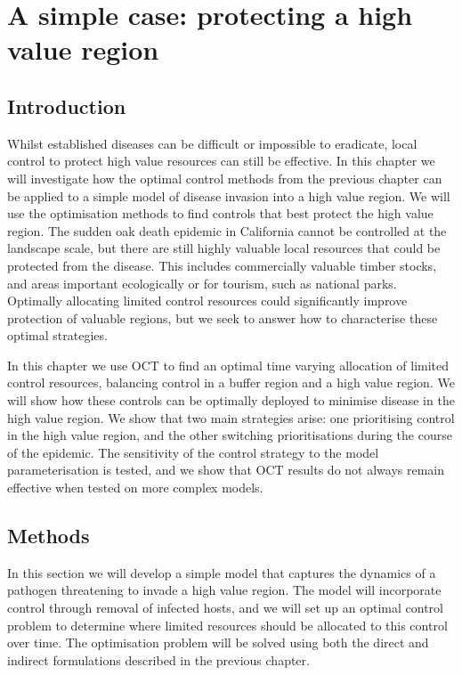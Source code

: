 %
\chapter{A simple case: protecting a high value region}\label{ch:three_patch}

\section{Introduction}\label{sec:ch3:intro}

Whilst established diseases can be difficult or impossible to eradicate, local control to protect high value resources can still be effective. In this chapter we will investigate how the optimal control methods from the previous chapter can be applied to a simple model of disease invasion into a high value region. We will use the optimisation methods to find controls that best protect the high value region. The sudden oak death epidemic in California cannot be controlled at the landscape scale, but there are still highly valuable local resources that could be protected from the disease. This includes commercially valuable timber stocks, and areas important ecologically or for tourism, such as national parks. Optimally allocating limited control resources could significantly improve protection of valuable regions, but we seek to answer how to characterise these optimal strategies.

In this chapter we use OCT to find an optimal time varying allocation of limited control resources, balancing control in a buffer region and a high value region. We will show how these controls can be optimally deployed to minimise disease in the high value region. We show that two main strategies arise: one prioritising control in the high value region, and the other switching prioritisations during the course of the epidemic. The sensitivity of the control strategy to the model parameterisation is tested, and we show that OCT results do not always remain effective when tested on more complex models.

\section{Methods}

In this section we will develop a simple model that captures the dynamics of a pathogen threatening to invade a high value region. The model will incorporate control through removal of infected hosts, and we will set up an optimal control problem to determine where limited resources should be allocated to this control over time. The optimisation problem will be solved using both the direct and indirect formulations described in the previous chapter.

